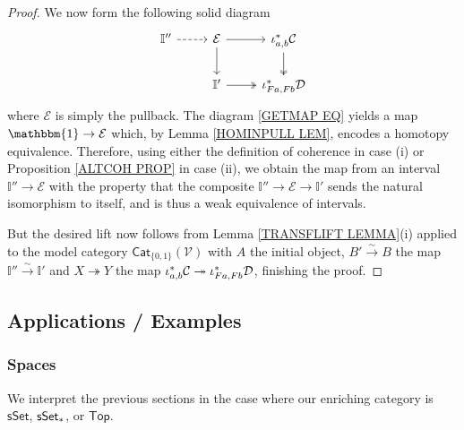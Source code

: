 \documentclass[a4paper,10pt
,draft
]{article}%
\numberwithin{equation}{section}
\numberwithin{figure}{section}
\theoremstyle{definition} %
\newcommand{\Top}{\ensuremath{\mathsf{Top}}}
\newcommand{\sSet}{\ensuremath{\mathsf{sSet}}}%
\newcommand{\V}{\ensuremath{\mathcal V}}
\newcommand{\1}{\ensuremath{\mathbbm 1}}%
\begin{document}
\begin{proof}
We now form the following solid diagram
\begin{equation}
\begin{tikzcd}
	\mathbb{I}'' \ar[dashed]{r}
&
	\mathcal{E} \ar{d} \ar{r}
&
	\iota^{\**}_{a,b} \mathcal{C} \ar[twoheadrightarrow]{d}
\\
	&
	\mathbb{I}' \ar[twoheadrightarrow]{r} 
&
	\iota^{\**}_{Fa,Fb} \mathcal{D}
\end{tikzcd}
\end{equation}
where $\mathcal{E}$ is simply the pullback.
The diagram 
\eqref{GETMAP EQ}
yields a map $\mathbbm{1} \to \mathcal{E}$ which,
by Lemma \ref{HOMINPULL LEM},
encodes a homotopy equivalence.
Therefore, using either the definition of coherence in case (i) or Proposition \ref{ALTCOH PROP} in case (ii),
we obtain the map from an interval 
$\mathbb{I}'' \to \mathcal{E}$
with the property that 
the composite 
$\mathbb{I}'' \to \mathcal{E} \to \mathbb{I}'$
sends the natural isomorphism to itself, 
and is thus a weak equivalence of intervals.

But the desired lift now follows from 
Lemma \ref{TRANSFLIFT LEMMA}(i)
applied to the model category
$\mathsf{Cat}_{\{0,1\}}(\V)$
with $A$ the initial object,
$B' \xrightarrow{\sim} B$ the map
$\mathbb{I}'' \xrightarrow{\sim} \mathbb{I}'$
and $X \twoheadrightarrow Y$
the map 
$\iota^{\**}_{a,b} \mathcal{C}
\twoheadrightarrow
\iota^{\**}_{Fa,Fb} \mathcal{D}$,
finishing the proof.
\end{proof}






\newpage






\subsection{Applications / Examples}

\subsubsection*{Spaces}
We interpret the previous sections in the case where our enriching category is $\sSet$, $\sSet_{\**}$, or $\Top$.
\end{document}
